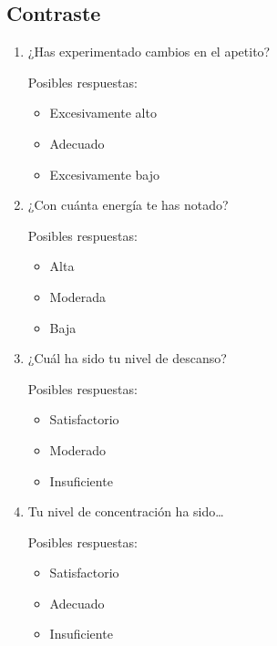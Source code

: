         \subsection{Contraste}
            \label{cuestionarios:contraste}
            \begin{enumerate}
                \item ¿Has experimentado cambios en el apetito?
                
                Posibles respuestas:
                    \begin{itemize}
                        \item Excesivamente alto  
                        \item Adecuado
                        \item Excesivamente bajo
                    \end{itemize}

                \item ¿Con cuánta energía te has notado?
                
                Posibles respuestas:
                    \begin{itemize}
                        \item Alta
                        \item Moderada
                        \item Baja
                    \end{itemize}

                \item ¿Cuál ha sido tu nivel de descanso?
                
                Posibles respuestas:
                    \begin{itemize}
                        \item Satisfactorio  
                        \item Moderado
                        \item Insuficiente
                    \end{itemize}
                    
                \item Tu nivel de concentración ha sido…
                
                Posibles respuestas:
                    \begin{itemize}
                        \item Satisfactorio  
                        \item Adecuado
                        \item Insuficiente
                    \end{itemize}
                    

\end{enumerate}
